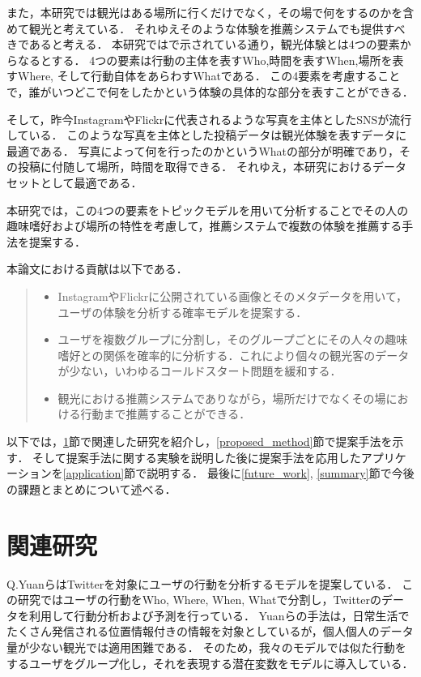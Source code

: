 \documentclass[a4j,10pt, twocolumn]{jarticle}
\begin{document}
また，本研究では観光はある場所に行くだけでなく，その場で何をするのかを含めて観光と考えている．
それゆえそのような体験を推薦システムでも提供すべきであると考える．
本研究では\cite{yuan2013and}で示されている通り，観光体験とは4つの要素からなるとする．
4つの要素は行動の主体を表すWho,時間を表すWhen,場所を表すWhere, そして行動自体をあらわすWhatである．
この4要素を考慮することで，誰がいつどこで何をしたかという体験の具体的な部分を表すことができる．

そして，昨今InstagramやFlickrに代表されるような写真を主体としたSNSが流行している．
このような写真を主体とした投稿データは観光体験を表すデータに最適である．
写真によって何を行ったのかというWhatの部分が明確であり，その投稿に付随して場所，時間を取得できる．
それゆえ，本研究におけるデータセットとして最適である．

本研究では，この4つの要素をトピックモデルを用いて分析することでその人の趣味嗜好および場所の特性を考慮して，推薦システムで複数の体験を推薦する手法を提案する．

本論文における貢献は以下である．
\begin{quote}
  \begin{itemize}
    \item InstagramやFlickrに公開されている画像とそのメタデータを用いて，ユーザの体験を分析する確率モデルを提案する．
    \item ユーザを複数グループに分割し，そのグループごとにその人々の趣味嗜好との関係を確率的に分析する．これにより個々の観光客のデータが少ない，いわゆるコールドスタート問題を緩和する．
    \item 観光における推薦システムでありながら，場所だけでなくその場における行動まで推薦することができる．
  \end{itemize}
\end{quote}

以下では，\ref{related_work}節で関連した研究を紹介し，\ref{proposed_method}節で提案手法を示す．
そして提案手法に関する実験を説明した後に提案手法を応用したアプリケーションを\ref{application}節で説明する．
最後に\ref{future_work}, \ref{summary}節で今後の課題とまとめについて述べる．

\section{関連研究} \label{related_work}
Q.YuanらはTwitterを対象にユーザの行動を分析するモデルを提案している\cite{yuan2013and}\cite{yuan2015and}．
この研究ではユーザの行動をWho, Where, When, Whatで分割し，Twitterのデータを利用して行動分析および予測を行っている．
Yuanらの手法は，日常生活でたくさん発信される位置情報付きの情報を対象としているが，個人個人のデータ量が少ない観光では適用困難である．
そのため，我々のモデルでは似た行動をするユーザをグループ化し，それを表現する潜在変数をモデルに導入している．
\end{document}
